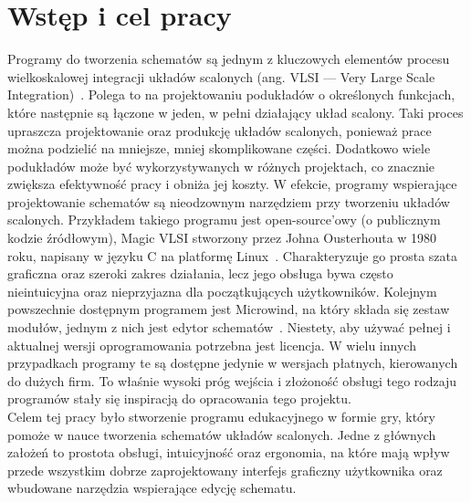 \chapter{Wstęp i cel pracy}

Programy do tworzenia schematów są jednym z kluczowych elementów
procesu wielkoskalowej integracji układów scalonych (ang. VLSI — Very Large Scale Integration)~\cite{VLSI_insemi}.
Polega to na projektowaniu podukładów o określonych funkcjach,
które następnie są łączone w jeden, w pełni działający układ scalony.
Taki proces upraszcza projektowanie oraz produkcję układów scalonych, ponieważ prace można podzielić na mniejsze,
mniej skomplikowane części.
Dodatkowo wiele podukładów może być wykorzystywanych w różnych projektach,
co znacznie zwiększa efektywność pracy i obniża jej koszty.
W efekcie,
programy wspierające projektowanie schematów są nieodzownym narzędziem przy tworzeniu układów scalonych.
Przykładem takiego programu jest open-source'owy (o publicznym kodzie źródłowym),
Magic VLSI stworzony przez Johna Ousterhouta w 1980 roku,
napisany w języku C na platformę Linux~\cite{MAGIC_article}.
Charakteryzuje go prosta szata graficzna oraz szeroki zakres działania,
lecz jego obsługa bywa często nieintuicyjna oraz nieprzyjazna dla początkujących użytkowników.
Kolejnym powszechnie dostępnym programem jest Microwind,\linebreak
na który składa się zestaw modułów,
jednym z nich jest edytor schematów~\cite{Microwind}.\linebreak
Niestety, aby używać pełnej i aktualnej wersji oprogramowania potrzebna jest licencja.\linebreak
W wielu innych przypadkach programy te są dostępne jedynie w wersjach płatnych, kierowanych do dużych firm.
To właśnie wysoki próg wejścia
i złożoność obsługi tego rodzaju programów stały się inspiracją do opracowania tego projektu.\\
\indent Celem tej pracy było stworzenie
programu edukacyjnego w formie gry, który pomoże w nauce tworzenia schematów układów scalonych.
Jedne z głównych założeń to prostota obsługi, intuicyjność oraz ergonomia,
na które mają wpływ przede wszystkim dobrze zaprojektowany interfejs graficzny użytkownika
oraz wbudowane narzędzia wspierające edycję schematu.
